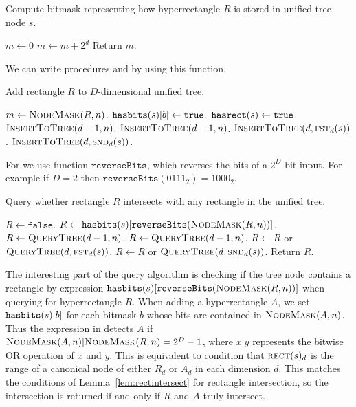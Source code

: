 \documentclass[english,gradu]{tktltiki2018}
\begin{document}
\begin{alg}\label{alg:maskof}
Compute bitmask representing how hyperrectangle $R$ is stored in unified tree node $s$.
\begin{algorithmic}
	\State $m\gets 0$
			\State $m\gets m + 2^d$
		\EndIf
	\EndFor
	\State Return $m$.
\EndProcedure
\end{algorithmic}
\end{alg}

We can write procedures \adddt and \checkdt by using this function.

\begin{alg}\label{alg:uadd}
Add rectangle $R$ to $D$-dimensional unified tree.
\begin{algorithmic}
		\State $m\gets\textsc{NodeMask}(R,n)$.
				\State $\texttt{hasbits}(s)[b]\gets\texttt{true}.$
			\EndIf
		\EndFor
		\State $\texttt{hasrect}(s)\gets\texttt{true}$.
		\State $\textsc{InsertToTree}(d-1,n)$.
		\State $\textsc{InsertToTree}(d-1,n)$.
		\State $\textsc{InsertToTree}(d,\textsc{fst}_{d}(s))$.
		\State $\textsc{InsertToTree}(d,\textsc{snd}_{d}(s))$.
	\EndIf
\EndProcedure
\end{algorithmic}
\end{alg}

For \checkdt we use function $\texttt{reverseBits}$, which reverses the bits of a $2^D$-bit input.
For example if $D=2$ then $\texttt{reverseBits}(0111_2)=1000_2$.

\begin{alg}\label{alg:ucheck}
Query whether rectangle $R$ intersects with any rectangle in the unified tree.
\begin{algorithmic}
	\State $R\gets\texttt{false}$.
		\State $R\gets\texttt{hasbits}(s)[\texttt{reverseBits}(\textsc{NodeMask}(R,n))]$.
		\State $R\gets\textsc{QueryTree}(d-1,n)$.
		\State $R\gets\textsc{QueryTree}(d-1,n)$.
		\State $R\gets R$ or $\textsc{QueryTree}(d,\textsc{fst}_{d}(s))$.
		\State $R\gets R$ or $\textsc{QueryTree}(d,\textsc{snd}_{d}(s))$.
	\EndIf
	\State Return $R$.
\EndProcedure
\end{algorithmic}
\end{alg}

The interesting part of the query algorithm is checking if the tree node contains a rectangle by expression $\texttt{hasbits}(s)[\texttt{reverseBits}(\textsc{NodeMask}(R,n))]$ when querying for hyperrectangle $R$.
When adding a hyperrectangle $A$, we set $\texttt{hasbits}(s)[b]$ for each bitmask $b$ whose bits are contained in $\textsc{NodeMask}(A,n)$.
Thus the expression in \checkdt detects $A$ if $\textsc{NodeMask}(A,n)|\textsc{NodeMask}(R,n)=2^D-1$, where $x|y$ represents the bitwise OR operation of $x$ and $y$.
This is equivalent to condition that $\textsc{rect}(s)_d$ is the range of a canonical node of either $R_d$ or $A_d$ in each dimension $d$.
This matches the conditions of Lemma~\ref{lem:rectintersect} for rectangle intersection, so the intersection is returned if and only if $R$ and $A$ truly intersect.
\end{document}
